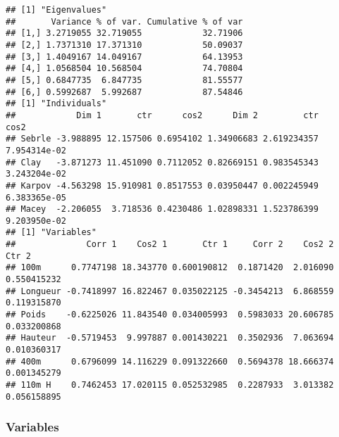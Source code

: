 \documentclass[
]{article}
\newenvironment{Shaded}{\begin{snugshade}}{\end{snugshade}}
\newcommand{\AttributeTok}[1]{\textcolor[rgb]{0.77,0.63,0.00}{#1}}
\newcommand{\DecValTok}[1]{\textcolor[rgb]{0.00,0.00,0.81}{#1}}
\newcommand{\FunctionTok}[1]{\textcolor[rgb]{0.00,0.00,0.00}{#1}}
\newcommand{\NormalTok}[1]{#1}
\newcommand{\OtherTok}[1]{\textcolor[rgb]{0.56,0.35,0.01}{#1}}
\newcommand{\SpecialCharTok}[1]{\textcolor[rgb]{0.00,0.00,0.00}{#1}}
\newcommand{\StringTok}[1]{\textcolor[rgb]{0.31,0.60,0.02}{#1}}
\begin{document}
\begin{Shaded}
\end{Shaded}

\begin{verbatim}
## [1] "Eigenvalues"
##       Variance % of var. Cumulative % of var
## [1,] 3.2719055 32.719055            32.71906
## [2,] 1.7371310 17.371310            50.09037
## [3,] 1.4049167 14.049167            64.13953
## [4,] 1.0568504 10.568504            74.70804
## [5,] 0.6847735  6.847735            81.55577
## [6,] 0.5992687  5.992687            87.54846
## [1] "Individuals"
##            Dim 1       ctr      cos2      Dim 2         ctr         cos2
## Sebrle -3.988895 12.157506 0.6954102 1.34906683 2.619234357 7.954314e-02
## Clay   -3.871273 11.451090 0.7112052 0.82669151 0.983545343 3.243204e-02
## Karpov -4.563298 15.910981 0.8517553 0.03950447 0.002245949 6.383365e-05
## Macey  -2.206055  3.718536 0.4230486 1.02898331 1.523786399 9.203950e-02
## [1] "Variables"
##              Corr 1    Cos2 1       Ctr 1     Corr 2    Cos2 2       Ctr 2
## 100m      0.7747198 18.343770 0.600190812  0.1871420  2.016090 0.550415232
## Longueur -0.7418997 16.822467 0.035022125 -0.3454213  6.868559 0.119315870
## Poids    -0.6225026 11.843540 0.034005993  0.5983033 20.606785 0.033200868
## Hauteur  -0.5719453  9.997887 0.001430221  0.3502936  7.063694 0.010360317
## 400m      0.6796099 14.116229 0.091322660  0.5694378 18.666374 0.001345279
## 110m H    0.7462453 17.020115 0.052532985  0.2287933  3.013382 0.056158895
\end{verbatim}

\hypertarget{variables}{%
\subsubsection{Variables}\label{variables}}
\end{document}
